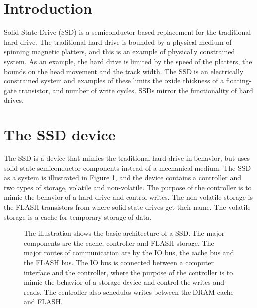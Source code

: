 \documentclass[jounal,letterpaper]{IEEEtran}
\begin{document}
\section{Introduction}
 Solid State Drive (SSD) is a semiconductor-based replacement for the traditional hard drive.  The traditional hard drive is bounded by a physical medium of spinning magnetic platters, and this is an example of physically constrained system.  As an example, the hard drive is limited by the speed of the platters, the bounds on the head movement and the track width.  The SSD is an electrically constrained system and examples of these limits the oxide thickness of a floating-gate transistor, and number of write cycles.  SSDs mirror the functionality of hard drives.



\section{The SSD device}
The SSD is a device that mimics the traditional hard drive in behavior, but uses solid-state semiconductor components instead of a mechanical medium.  The SSD as a system is illustrated in Figure \ref{fig:ssdoverview}, and the device contains a controller and two types of storage, volatile and non-volatile.  The purpose of the controller is to mimic the behavior of a hard drive and control writes.  The non-volatile storage is the FLASH transistors from where solid state drives get their name.  The volatile storage is a cache for temporary storage of data. 

\begin{figure}[ht]
  \begin{center}
  \epsfxsize=3.2in

   \caption{The illustration shows the basic architecture of a SSD.  The major components are the cache, controller and FLASH storage.  The major routes of communication are by the IO bus, the cache bus and the FLASH bus.  The IO bus is connected between a computer interface and the controller, where the purpose of the controller is to mimic the behavior of a storage device and control the writes and reads.  The controller also schedules writes between the DRAM cache and FLASH.
   }
   \label{fig:ssdoverview}
   \end{center}
   \vskip -0.2in
\end{figure}
\end{document}
